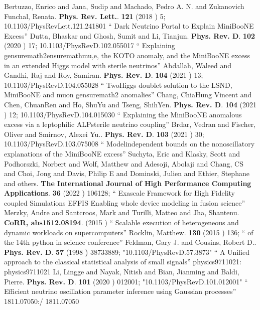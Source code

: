\documentclass{article}
\begin{document}
\begin{thebibliography}{99}
  Bertuzzo, Enrico and Jana, Sudip and Machado, Pedro A. N. and Zukanovich Funchal, Renata. {\bf  Phys. Rev. Lett.}. {\bf  121} (2018 )  5;  {10.1103/PhysRevLett.121.241801} `` Dark Neutrino Portal to Explain MiniBooNE Excess''
  Dutta, Bhaskar and Ghosh, Sumit and Li, Tianjun. {\bf  Phys. Rev. D}. {\bf  102} (2020 )  17;  {10.1103/PhysRevD.102.055017} `` Explaining gensuremath2ensuremathmu,e, the KOTO anomaly, and the MiniBooNE excess in an extended Higgs model with sterile neutrinos''
  Abdallah, Waleed and Gandhi, Raj and Roy, Samiran. {\bf  Phys. Rev. D}. {\bf  104} (2021 )  13;  {10.1103/PhysRevD.104.055028} `` TwoHiggs doublet solution to the LSND, MiniBooNE and muon gensuremath2 anomalies''
  Chang, ChiaHung Vincent and Chen, ChuanRen and Ho, ShuYu and Tseng, ShihYen. {\bf  Phys. Rev. D}. {\bf  104} (2021 )  12;  {10.1103/PhysRevD.104.015030} `` Explaining the MiniBooNE anomalous excess via a leptophilic ALPsterile neutrino coupling''
  Brdar, Vedran and Fischer, Oliver and Smirnov, Alexei Yu.. {\bf  Phys. Rev. D}. {\bf  103} (2021 )  30;  {10.1103/PhysRevD.103.075008} `` Modelindependent bounds on the nonoscillatory explanations of the MiniBooNE excess''
 Suchyta, Eric and Klasky, Scott and Podhorszki, Norbert and Wolf, Matthew and Adesoji, Abolaji and Chang, CS and Choi, Jong and Davis, Philip E and Dominski, Julien and Ethier, Stephane and others. {\bf The International Journal of High Performance Computing Applications}. {\bf 36} (2022 ) 106128; `` Exascale Framework for High Fidelity coupled Simulations EFFIS Enabling whole device modeling in fusion science''
 Merzky, Andre and Santcroos, Mark and Turilli, Matteo and Jha, Shantenu. {\bf CoRR, abs1512.08194}. (2015 ) `` Scalable execution of heterogeneous and dynamic workloads on supercomputers''
 Rocklin, Matthew. {\bf 130} (2015 ) 136; `` of the 14th python in science conference''
  Feldman, Gary J. and Cousins, Robert D.. {\bf  Phys. Rev. D}. {\bf  57} (1998 )  38733889;  "10.1103/PhysRevD.57.3873" `` A Unified approach to the classical statistical analysis of small signals'' physics9711021: physics9711021
  Li, Lingge and Nayak, Nitish and Bian, Jianming and Baldi, Pierre. {\bf  Phys. Rev. D}. {\bf  101} (2020 )  012001;  "10.1103/PhysRevD.101.012001" `` Efficient neutrino oscillation parameter inference using Gaussian processes'' 1811.07050:/ 1811.07050

\end{thebibliography}
\end{document}
